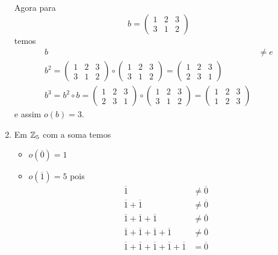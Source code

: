 \begin{exemplos}
\begin{enumerate}[label={\arabic*})]
        Agora para
        \[
        	b = \begin{pmatrix}
        		1 & 2 & 3\\
        		3 & 1 & 2
        	\end{pmatrix}
        \]
        temos
        \begin{align*}
        	b &\ne e\\
        	b^2 = \begin{pmatrix}
        		1 & 2 & 3\\
        		3 & 1 & 2
        	\end{pmatrix} \circ \begin{pmatrix}
        		1 & 2 & 3\\
        		3 & 1 & 2
        	\end{pmatrix} = \begin{pmatrix}
        		1 & 2 & 3\\
        		2 & 3 & 1
        	\end{pmatrix}\\
        	b^3 = b^2 \circ b = \begin{pmatrix}
        		1 & 2 & 3\\
        		2 & 3 & 1
        	\end{pmatrix} \circ \begin{pmatrix}
        		1 & 2 & 3\\
        		3 & 1 & 2
        	\end{pmatrix} = \begin{pmatrix}
        		1 & 2 & 3\\
        		1 & 2 & 3
        	\end{pmatrix}
        \end{align*}
        e assim $o(b) = 3$.

        \item Em $\mathbb{Z}_5$ com a soma temos
        \begin{itemize}
        	\item $o(\overline{0}) = 1$

        	\item $o(\overline{1}) = 5$ pois
        	\begin{align*}
        		\overline{1} &\ne \overline{0}\\
        		\overline{1} + \overline{1} &\ne \overline{0}\\
        		\overline{1} + \overline{1} + \overline{1} &\ne \overline{0}\\
        		\overline{1} + \overline{1} + \overline{1} + \overline{1} &\ne \overline{0}\\
        		\overline{1} + \overline{1} + \overline{1} + \overline{1} + \overline{1} &= \overline{0}
        	\end{align*}


\end{itemize}
\end{enumerate}
\end{exemplos}
